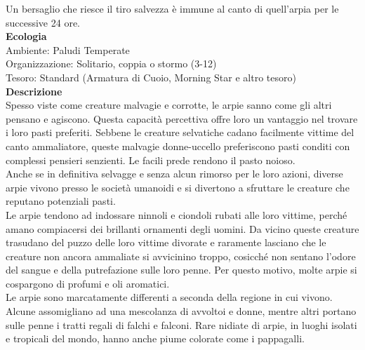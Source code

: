 \begin{multicols}{2}
Un bersaglio che riesce il tiro salvezza è immune al canto di quell'arpia per le successive 24 ore.\\
\textbf{Ecologia}\\
Ambiente: Paludi Temperate\\
Organizzazione: Solitario, coppia o stormo (3-12)\\
Tesoro: Standard (Armatura di Cuoio, Morning Star e altro tesoro)\\
\textbf{Descrizione}\\
Spesso viste come creature malvagie e corrotte, le arpie sanno come gli altri pensano e agiscono. Questa capacità percettiva offre loro un vantaggio nel trovare i loro pasti preferiti. Sebbene le creature selvatiche cadano facilmente vittime del canto ammaliatore, queste malvagie donne-uccello preferiscono pasti conditi con complessi pensieri senzienti. Le facili prede rendono il pasto noioso.\\
Anche se in definitiva selvagge e senza alcun rimorso per le loro azioni, diverse arpie vivono presso le società umanoidi e si divertono a sfruttare le creature che reputano potenziali pasti.\\
Le arpie tendono ad indossare ninnoli e ciondoli rubati alle loro vittime, perché amano compiacersi dei brillanti ornamenti degli uomini. Da vicino queste creature trasudano del puzzo delle loro vittime divorate e raramente lasciano che le creature non ancora ammaliate si avvicinino troppo, cosicché non sentano l’odore del sangue e della putrefazione sulle loro penne. Per questo motivo, molte arpie si cospargono di profumi e oli aromatici.\\
Le arpie sono marcatamente differenti a seconda della regione in cui vivono. Alcune assomigliano ad una mescolanza di avvoltoi e donne, mentre altri portano sulle penne i tratti regali di falchi e falconi. Rare nidiate di arpie, in luoghi isolati e tropicali del mondo, hanno anche piume colorate come i pappagalli.\\


\end{multicols}
